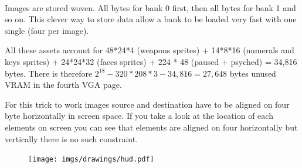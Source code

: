     \begin{minipage}{.3\textwidth}
  \end{minipage}
\begin{minipage}{.3\textwidth}
  \end{minipage}
\begin{minipage}{.3\textwidth}
  \end{minipage}
\par

    \begin{minipage}{.3\textwidth}
  \end{minipage}
\begin{minipage}{.3\textwidth}
  \end{minipage}
\begin{minipage}{.3\textwidth}
  \end{minipage}
\par


\begin{minipage}{.1\textwidth}
  \end{minipage}
\begin{minipage}{.1\textwidth}
  \end{minipage}
\begin{minipage}{.1\textwidth}
  \end{minipage}
\begin{minipage}{.1\textwidth}
  \end{minipage}
  \begin{minipage}{.3\textwidth}
  \end{minipage}
\begin{minipage}{.3\textwidth}
  \end{minipage}\

 Images are stored woven. All bytes for bank 0 first, then all bytes for bank 1 and so on. This clever way to store data allow a bank to be loaded very fast with one single  (four  per image).\\
\par
All these assets account for 48*24*4 (weapons sprites) + 14*8*16 (numerals and keys sprites) + 24*24*32 (faces sprites) + 224 * 48 (paused + psyched) = 34,816 bytes. There is therefore $2^{18}-320*208*3 - 34,816=27,648$ bytes unused VRAM in the fourth VGA page.\\
\par
For this trick to work images source and destination have to be aligned on four byte horizontally in screen space. If you take a look at the location of each elements on screen you can see that elements are aligned on four horizontally but vertically there is no such constraint.
\begin{figure}[H]
  \centering
 \texttt{[image: imgs/drawings/hud.pdf]}
\end{figure}

